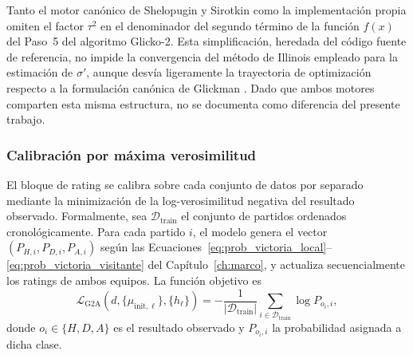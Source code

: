 \begin{obs}
	Tanto el motor can\'onico de Shelopugin y Sirotkin como la implementaci\'on propia omiten el factor $\tau^2$ en el denominador del segundo t\'ermino de la funci\'on $f(x)$ del Paso~5 del algoritmo Glicko-2. Esta simplificaci\'on, heredada del c\'odigo fuente de referencia, no impide la convergencia del m\'etodo de Illinois empleado para la estimaci\'on de $\sigma'$, aunque desv\'ia ligeramente la trayectoria de optimizaci\'on respecto a la formulaci\'on can\'onica de Glickman \cite{Glickman2022}. Dado que ambos motores comparten esta misma estructura, no se documenta como diferencia del presente trabajo.
\end{obs}

\subsubsection{Calibraci\'on por m\'axima verosimilitud}
\label{subsubsec:calibracion_glicko}

El bloque de rating se calibra sobre cada conjunto de datos por separado mediante la minimizaci\'on de la log-verosimilitud negativa del resultado observado. Formalmente, sea $\mathcal{D}_{\text{train}}$ el conjunto de partidos ordenados cronol\'ogicamente. Para cada partido $i$, el modelo genera el vector $(P_{H,i}, P_{D,i}, P_{A,i})$ seg\'un las Ecuaciones~\eqref{eq:prob_victoria_local}--\eqref{eq:prob_victoria_visitante} del Cap\'itulo~\ref{ch:marco}, y actualiza secuencialmente los ratings de ambos equipos. La funci\'on objetivo es
\begin{equation}
	\mathcal{L}_{\text{G2A}}(d, \{\mu_{\text{init},\ell}\}, \{h_\ell\}) 
	= -\frac{1}{|\mathcal{D}_{\text{train}}|}
	\sum_{i \in \mathcal{D}_{\text{train}}} \log P_{o_i,i},
\end{equation}
donde $o_i \in \{H,D,A\}$ es el resultado observado y $P_{o_i,i}$ la probabilidad asignada a dicha clase.

